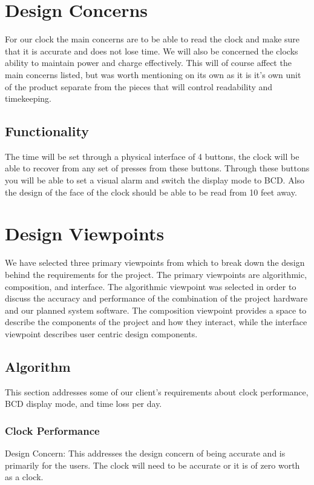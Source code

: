 \documentclass[10pt,draftclsnofoot,onecolumn]{IEEEtran}
\begin{document}
\section{Design Concerns}

For our clock the main concerns are to be able to read the clock and make sure that it is accurate and does not lose time.
We will also be concerned the clocks ability to maintain power and charge effectively.
This will of course affect the main concerns listed, but was worth mentioning on its own as it is it's own unit of the product separate from the pieces that will control readability and timekeeping.

\subsection{Functionality}
The time will be set through a physical interface of 4 buttons, the clock will be able to recover from any set of presses from these buttons.
Through these buttons you will be able to set a visual alarm and switch the display mode to BCD.
Also the design of the face of the clock should be able to be read from 10 feet away.

\section{Design Viewpoints}

We have selected three primary viewpoints from which to break down the design behind the requirements for the project. 
The primary viewpoints are algorithmic, composition, and interface.
The algorithmic viewpoint was selected in order to discuss the accuracy and performance of the combination of the project hardware and our planned system software.
The composition viewpoint provides a space to describe the components of the project and how they interact, while the interface viewpoint describes user centric design components.


\subsection{Algorithm}
This section addresses some of our client's requirements about clock performance, BCD display mode, and time loss per day.

\subsubsection{Clock Performance}
Design Concern: This addresses the design concern of being accurate and is primarily for the users.
The clock will need to be accurate or it is of zero worth as a clock.
\end{document}
